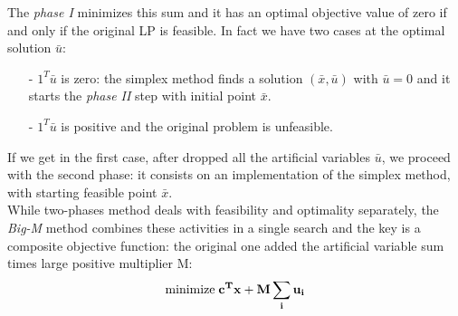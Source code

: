 \documentclass[a4paper,10 pt,titlepage,twoside]{book}
\theoremstyle{plain}
\theoremstyle{definition}
\theoremstyle{remark}
\begin{document}
The \textit{phase I} minimizes this sum and it has an optimal objective value of zero if and only if the original LP is feasible. \newpage In fact we have two cases at the optimal solution $\bar{u}$: 
\begin{itemize}
	\item[-]$1^{T}\bar{u}$ is zero: the simplex method finds a solution $(\bar{x},\bar{u})$ with $\bar{u}=0$ and it starts the \textit{phase II} step with initial point $\bar{x}$.
	\item[-]$1^{T}\bar{u}$ is positive and the original problem is unfeasible.
\end{itemize}
If we get in the first case, after dropped all the artificial variables $\bar{u}$, we proceed with the second phase: it consists on an implementation of the simplex method, with starting feasible point $\bar{x}$.\\ 
While two-phases method deals with feasibility and optimality separately, the \textit{Big-M} method combines these activities in a single search and the key is a composite objective function: the original one added the artificial variable sum times  large positive multiplier M:\\
\begin{equation}
\text{minimize\;}\mathbf{c^{T}x+M \sum_{i}{u}_{i}}\\
\end{equation}  
\end{document}
